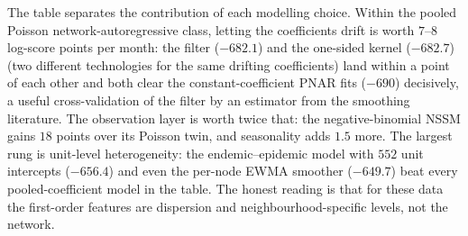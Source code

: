 \documentclass[12pt]{article}
\theoremstyle{plain}
\theoremstyle{definition}
\theoremstyle{remark}
\newcommand{\NumRegions}{552}
\begin{document}
\begin{table}[t]
\centering\footnotesize
\caption{Benchmarks under a common rolling-origin protocol: mean per-origin log score at $h=1$ and $h=2$ (sum over the \NumRegions{} neighbourhoods, higher is better. The rolling row shares the top row's design exactly), difference from the best NSSM variant with $95\%$ moving-block-bootstrap interval (asterisk: interval excludes zero), and MAE of the conditional-mean point forecast at $h=1$. NSSM predictives are full coefficient mixtures ($S=400$). Benchmark predictives are plug-in at the maximum-likelihood fit, their standard usage. Unit offsets are computed from the training window only. Two-step entries are shown where the model's two-step predictive mean exists and was simulated. The count-median NSSM forecasts of Table~\ref{tab:pointfc} (MAE $0.75$) are sharper than any mean forecast shown here.}\label{tab:bench}
\setlength{\tabcolsep}{4pt}
\end{table}

The table separates the contribution of each modelling choice. Within the pooled Poisson network-autoregressive class, letting the coefficients drift is worth $7$--$8$ log-score points per month: the filter ($-682.1$) and the one-sided kernel ($-682.7$) (two different technologies for the same drifting coefficients) land within a point of each other and both clear the constant-coefficient PNAR fits ($-690$) decisively, a useful cross-validation of the filter by an estimator from the smoothing literature. The observation layer is worth twice that: the negative-binomial NSSM gains $18$ points over its Poisson twin, and seasonality adds $1.5$ more. The largest rung is unit-level heterogeneity: the endemic--epidemic model with $552$ unit intercepts ($-656.4$) and even the per-node EWMA smoother ($-649.7$) beat every pooled-coefficient model in the table. The honest reading is that for these data the first-order features are dispersion and neighbourhood-specific levels, not the network.
\end{document}
